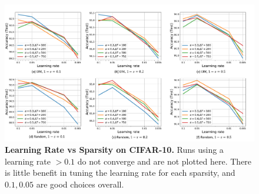 \begin{figure}[!b]
    \centering
    \includegraphics[width=\textwidth]{../openreview/figs/lr_sweep.pdf}
    \captionsetup{aboveskip=\figureaboveskip,belowskip=\figurebelowskip}
    \caption{\textbf{Learning Rate vs Sparsity on CIFAR-10.} Runs using a learning rate $> 0.1$ do not converge and are not plotted here. There is little benefit in tuning the learning rate for each sparsity, and $0.1, 0.05$ are good choices overall.}
    \label{fig:lr-sweep}
\end{figure}